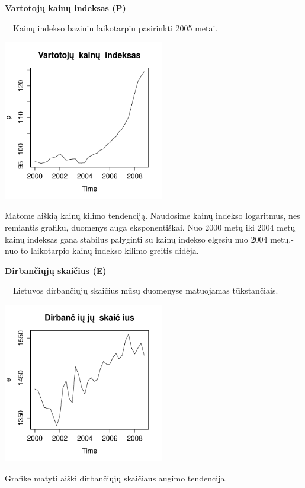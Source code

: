 \documentclass[12pt,a4paper]{article}
\theoremstyle{change}\newtheorem{salyga}{Uždavinys}
\begin{document}
\begin{flushleft}
\textbf{\Large {Vartotojų kainų indeksas (P)}}
\end{flushleft}
\vskip 15pt
$\quad$Kainų indekso baziniu laikotarpiu pasirinkti 2005 metai.
\\
\begin{center}
\includegraphics[width=70mm,height=70mm]{p}
\end{center}
Matome aiškią kainų kilimo tendenciją. Naudosime kainų indekso logaritmus, nes remiantis grafiku, duomenys auga eksponentiškai. Nuo 2000 metų iki 2004 metų kainų indeksas gana stabilus palyginti su kainų indekso elgesiu nuo 2004 metų,- nuo to laikotarpio kainų indekso kilimo greitis didėja. 

\begin{flushleft}
\textbf{\Large {Dirbančiųjų skaičius (E)}}
\end{flushleft}
\vskip 15pt
$\quad$Lietuvos dirbančiųjų skaičius mūsų duomenyse matuojamas tūkstančiais.
\\
\begin{center}
\includegraphics[width=70mm,height=70mm]{e}
\end{center}
Grafike matyti aiški dirbančiųjų skaičiaus augimo tendencija. 
\end{document}
